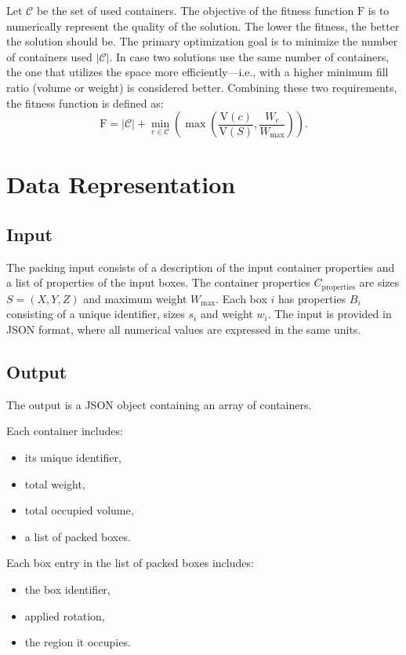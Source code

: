 Let $\mathcal{C}$ be the set of used containers.
The objective of the fitness function $\mathrm{F}$ is to numerically represent the quality of the solution. 
The lower the fitness, the better the solution should be. 
The primary optimization goal is to minimize the number of containers used $|\mathcal{C}|$. 
In case two solutions use the same number of containers, the one that utilizes the space more efficiently—i.e., with a higher minimum fill ratio (volume or weight) is considered better.
Combining these two requirements, the fitness function is defined as:
\[
\mathrm{F} = |\mathcal{C}| + \min_{c \in \mathcal{C}} \left( \max \left( \frac{\mathrm{V}(c)}{\mathrm{V}(S)}, \frac{W_c}{W_\text{max}} \right) \right).
\]


\section{Data Representation}

\subsection{Input}

The packing input consists of a description of the input container properties and a list of properties of the input boxes. 
The container properties $C_\text{properties}$ are sizes $S = (X, Y, Z)$ and maximum weight $W_\text{max}$. 
Each box $i$ has properties $B_i$ consisting of a unique identifier, sizes $s_i$ and weight $w_i$.
The input is provided in JSON format, where all numerical values are expressed in the same units.

\subsection{Output}

The output is a JSON object containing an array of containers.

Each container includes:
\begin{itemize}
    \item its unique identifier,
    \item total weight,
    \item total occupied volume,
    \item a list of packed boxes.
\end{itemize}

Each box entry in the list of packed boxes includes:
\begin{itemize}
    \item the box identifier,
    \item applied rotation,
    \item the region it occupies.
\end{itemize}

